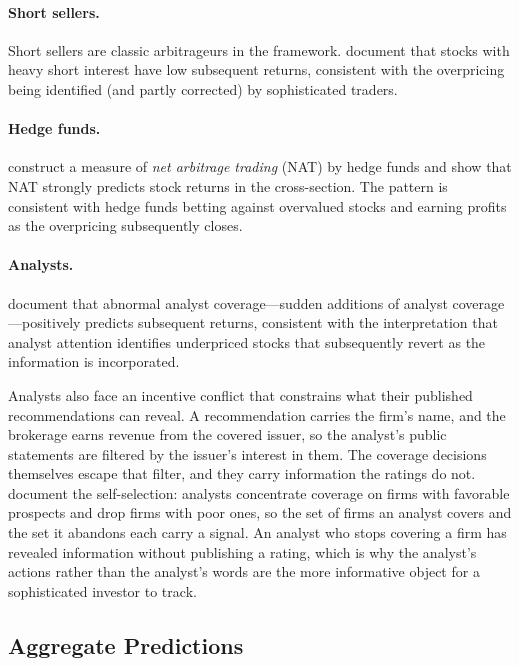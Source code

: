 \paragraph{Short sellers.} Short sellers are classic arbitrageurs in the \citet{delong1990} framework. \citet{asquithpathakritter2005} document that stocks with heavy short interest have low subsequent returns, consistent with the overpricing being identified (and partly corrected) by sophisticated traders.

\paragraph{Hedge funds.} \citet{chendahuang2018} construct a measure of \emph{net arbitrage trading} (NAT) by hedge funds and show that NAT strongly predicts stock returns in the cross-section. The pattern is consistent with hedge funds betting against overvalued stocks and earning profits as the overpricing subsequently closes.

\paragraph{Analysts.} \citet{leeso2017} document that abnormal analyst coverage---sudden additions of analyst coverage---positively predicts subsequent returns, consistent with the interpretation that analyst attention identifies underpriced stocks that subsequently revert as the information is incorporated.

Analysts also face an incentive conflict that constrains what their published recommendations can reveal. A recommendation carries the firm's name, and the brokerage earns revenue from the covered issuer, so the analyst's public statements are filtered by the issuer's interest in them. The coverage decisions themselves escape that filter, and they carry information the ratings do not. \citet{mcnicholsobrien1997} document the self-selection: analysts concentrate coverage on firms with favorable prospects and drop firms with poor ones, so the set of firms an analyst covers and the set it abandons each carry a signal. An analyst who stops covering a firm has revealed information without publishing a rating, which is why the analyst's actions rather than the analyst's words are the more informative object for a sophisticated investor to track.

\subsection{Aggregate Predictions}

